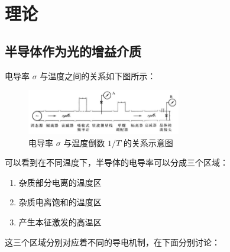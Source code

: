 \documentclass[font=default]{mpltx}
\begin{document}
\section{理论}\label{sec:theory}
\subsection{半导体作为光的增益介质}
电导率 $\sigma$ 与温度之间的关系如下图所示：

\begin{figure}[h]
\centering
\includegraphics[width=0.6\textwidth]{fig/0.jpg}
\caption{电导率 $\sigma$ 与温度倒数 $1/T$ 的关系示意图}
\end{figure}

可以看到在不同温度下，半导体的电导率可以分成三个区域：
\begin{enumerate}
\item 杂质部分电离的温度区
\item 杂质电离饱和的温度区
\item 产生本征激发的高温区
\end{enumerate}

这三个区域分别对应着不同的导电机制\cite{jindaishiyan}，在下面分别讨论：
\end{document}
